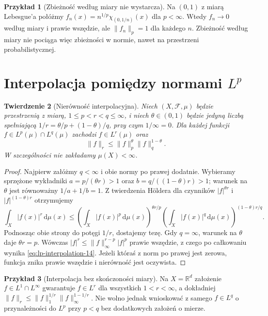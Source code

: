 \documentclass[11pt,a4paper,oneside]{book}
\numberwithin{equation}{chapter}
\theoremstyle{plain}
\newtheorem{twierdzenie}{Twierdzenie}[chapter]
\theoremstyle{definition}
\newtheorem{przyklad}[twierdzenie]{Przykład}
\theoremstyle{remark}
\begin{document}
\begin{przyklad}[Zbieżność według miary nie wystarcza]
Na $(0,1)$ z miarą Lebesgue'a połóżmy
$f_n(x)=n^{1/p}\chi_{(0,1/n)}(x)$ dla $p<\infty$.
Wtedy $f_n\to0$ według miary i prawie wszędzie,
ale $\|f_n\|_p=1$ dla każdego $n$.
Zbieżność według miary nie pociąga więc zbieżności
w normie, nawet na przestrzeni probabilistycznej.
\end{przyklad}

\section{Interpolacja pomiędzy normami $L^p$}

\begin{twierdzenie}[Nierówność interpolacyjna]
\label{thm:lp-interpolation-14}
Niech $(X,\mathcal F,\mu)$ będzie przestrzenią z miarą,
$1\le p<r<q\le\infty$, i niech $\theta\in(0,1)$
będzie jedyną liczbą spełniającą
$1/r=\theta/p+(1-\theta)/q$, przy czym $1/\infty=0$.
Dla każdej funkcji $f\in L^p(\mu)\cap L^q(\mu)$
zachodzi $f\in L^r(\mu)$ oraz
\begin{equation}\label{eq:lp-interpolation-14}
\|f\|_r\le\|f\|_p^{\theta}\|f\|_q^{1-\theta}.
\end{equation}
W szczególności nie zakładamy $\mu(X)<\infty$.
\end{twierdzenie}
\begin{proof}
Najpierw załóżmy $q<\infty$ i obie normy po prawej
dodatnie. Wybieramy sprzężone wykładniki
$a=p/(\theta r)>1$ oraz $b=q/((1-\theta)r)>1$;
warunek na $\theta$ jest równoważny $1/a+1/b=1$.
Z twierdzenia Höldera dla czynników
$|f|^{\theta r}$ i $|f|^{(1-\theta)r}$ otrzymujemy
\[
\int_X|f(x)|^r\,\mathrm d\mu(x)
\le\left(\int_X|f(x)|^p\,\mathrm d\mu(x)\right)^{\theta r/p}
\left(\int_X|f(x)|^q\,\mathrm d\mu(x)\right)^{(1-\theta)r/q}.
\]
Podnosząc obie strony do potęgi $1/r$, dostajemy tezę.
Gdy $q=\infty$, warunek na $\theta$ daje
$\theta r=p$. Wówczas
$|f|^r\le\|f\|_\infty^{r-p}|f|^p$
prawie wszędzie, z czego po całkowaniu wynika
\eqref{eq:lp-interpolation-14}. Jeżeli któraś
z norm po prawej jest zerowa, funkcja znika
prawie wszędzie i nierówność jest oczywista.
\end{proof}

\begin{przyklad}[Interpolacja bez skończoności miary]
Na $X=\mathbb R^d$ założenie $f\in L^1\cap L^\infty$
gwarantuje $f\in L^r$ dla wszystkich $1<r<\infty$,
a dokładniej $\|f\|_r\le\|f\|_1^{1/r}
\|f\|_\infty^{1-1/r}$. Nie wolno jednak wnioskować
z samego $f\in L^q$ o przynależności do $L^p$
przy $p<q$ bez dodatkowych założeń o mierze.
\end{przyklad}
\end{document}
